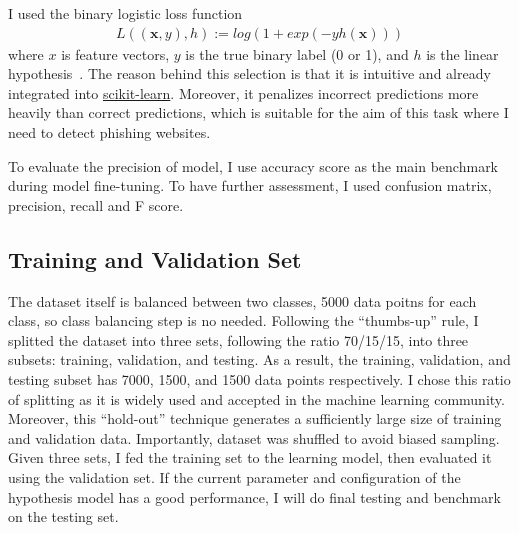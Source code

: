 I used the binary logistic loss function
\begin{align}
    L((\mathbf{x},y),h) := log(1+exp(-yh(\mathbf{x})))
\end{align}
where $x$ is feature vectors, $y$ is the true binary label (0 or 1), and $h$ is the linear hypothesis~\cite{ml-book}.
The reason behind this selection is that it is intuitive and already integrated into \href{https://scikit-learn.org/stable/}{scikit-learn}.
Moreover, it penalizes incorrect predictions more heavily than correct predictions, which is suitable for
the aim of this task where I need to detect phishing websites.

To evaluate the precision of model, I use accuracy score as the main benchmark during model fine-tuning. To have further assessment,
I used confusion matrix, precision, recall and F score.

\subsection{Training and Validation Set}
The dataset itself is balanced between two classes, 5000 data poitns for each class, so class balancing step
is no needed. Following the ``thumbs-up'' rule, I splitted the dataset into three sets, following the ratio 70/15/15,
into three subsets: training, validation, and testing. As a result, the training, validation, and testing subset
has 7000, 1500, and 1500 data points respectively. I chose this ratio of splitting as it is widely used and accepted
in the machine learning community. Moreover, this ``hold-out'' technique generates a sufficiently large size of
training and validation data. Importantly, dataset was shuffled to avoid biased sampling. Given three sets, I
fed the training set to the learning model, then evaluated it using the validation set. If the current parameter
and configuration of the hypothesis model has a good performance, I will do final testing and benchmark on the
testing set.